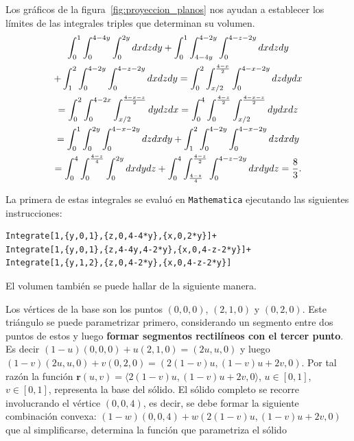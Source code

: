 Los gráficos de la figura~\ref{fig:proyeccion_planos} nos ayudan a establecer los límites de las integrales triples que determinan su volumen.
\begin{multline*}
  \displaystyle \int_{0}^{1}\int_{0}^{4-4y}\int_{0}^{2y}dxdzdy +\int_{0}^{1}\int_{4-4y}^{4-2y}\int_{0}^{4-z-2y} dxdzdy\\
  + \int_{1}^{2}\int_{0}^{4-2y}\int_{0}^{4-z-2y}dxdzdy=
  \displaystyle \int_{0}^{2}\int_{x/2}^{\frac{4-x}{2}}\int_{0}^{4-x-2y}dzdydx\\
  = \displaystyle \int_{0}^{2}\int_{0}^{4-2x}\int_{x/2}^{\frac{4-x-z}{2}}dydzdx= \int_{0}^{4}\int_{0}^{\frac{4-z}{2}}\int_{x/2}^{\frac{4-x-z}{2}}dydxdz\\
  = \displaystyle \int_{0}^{1}\int_{0}^{2y}\int_{0}^{4-x-2y}dzdxdy+\int_{1}^{2}\int_{0}^{4-2y}\int_{0}^{4-x-2y}dzdxdy \\
  = \displaystyle \int_{0}^{4}\int_{0}^{\frac{4-z}{4}}\int_{0}^{2y}dxdydz+\int_{0}^{4}\int_{\frac{4-z}{4}}^{\frac{4-z}{2}}\int_{0}^{4-z-2y}dxdydz =\frac{8}{3}.
\end{multline*}

La primera de estas integrales se evaluó en \verb"Mathematica" ejecutando las siguientes instrucciones:
\enlargethispage{\baselineskip}

\begin{tcolorbox}[title=\bf Instrucción en \verb"Mathematica"]\begin{Verbatim}[formatcom=\letraverbatim]
Integrate[1,{y,0,1},{z,0,4-4*y},{x,0,2*y}]+
Integrate[1,{y,0,1},{z,4-4y,4-2*y},{x,0,4-z-2*y}]+
Integrate[1,{y,1,2},{z,0,4-2*y},{x,0,4-z-2*y}]
\end{Verbatim}
\end{tcolorbox}

%
\pagebreak[0]
El volumen también se puede hallar de la siguiente manera.

Los vértices de la base son los puntos $(0,0,0)$, $(2,1,0)$ y $(0,2,0)$. Este triángulo se puede parametrizar primero, considerando un segmento entre dos puntos de estos y luego \textbf{formar segmentos rectilíneos con el tercer punto}. Es decir $(1-u)(0,0,0) + u(2,1,0) = (2u, u, 0)$ y luego $(1-v)(2u, u, 0) + v(0,2,0) = (2(1-v)u, (1-v)u + 2v, 0)$. Por tal razón la función $\mathbf{r}(u, v) = \langle 2(1-v)u, (1-v)u + 2v, 0 \rangle$, $u \in [0,1]$, $v \in [0,1]$, representa la base del sólido. El sólido completo se recorre involucrando el vértice $(0,0,4)$, es decir, se debe formar la siguiente combinación convexa: $(1-w)(0,0,4) + w(2(1-v)u, (1-v)u + 2v, 0)$ que al simplificarse, determina la función que parametriza el sólido

